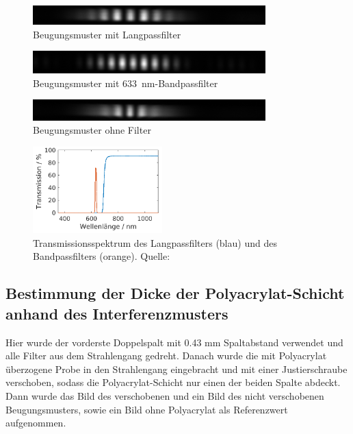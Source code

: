 \documentclass{article}
\begin{document}
\begin{figure}[H]
\centering
\caption{Beugungsmuster mit Langpassfilter}
\includegraphics[width=9cm]{moodle/img_LP.png}
\end{figure}

\begin{figure}[H]
\centering
\caption{Beugungsmuster mit 633~nm-Bandpassfilter}
\includegraphics[width=9cm]{moodle/img_633BP.png}
\end{figure}

\begin{figure}[H]
\centering
\caption{Beugungsmuster ohne Filter}
\includegraphics[width=9cm]{moodle/img__.png}
\end{figure}

\begin{figure}[H]
\centering
\caption{Transmissionsspektrum des Langpassfilters (blau) und des Bandpassfilters (orange). Quelle: \cite{quelle6}}
\includegraphics[width=5cm]{moodle/filter.png}
\end{figure}



\subsection{Bestimmung der Dicke der Polyacrylat-Schicht anhand des Interferenzmusters}

Hier wurde der vorderste Doppelspalt mit 0.43 mm Spaltabstand verwendet und alle Filter aus dem Strahlengang gedreht. Danach wurde die mit Polyacrylat überzogene Probe in den Strahlengang eingebracht und mit einer Justierschraube verschoben, sodass die Polyacrylat-Schicht nur einen der beiden Spalte abdeckt. Dann wurde das Bild des verschobenen und ein Bild des nicht verschobenen Beugungsmusters, sowie ein Bild ohne Polyacrylat als Referenzwert aufgenommen.
\end{document}
